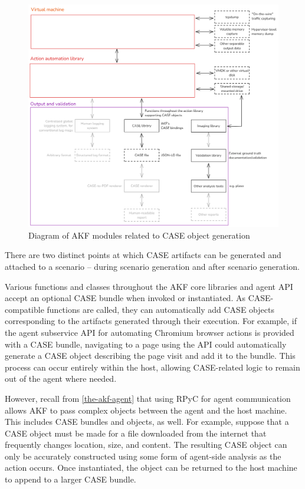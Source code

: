 \documentclass[letterpaper,12pt]{report}
\begin{document}
\begin{figure}[htbp]
\centering
\includegraphics[width=1\linewidth]{output-and-validation-b.png}
\caption{Diagram of AKF modules related to CASE object
generation}\label{fig:output-b}
\end{figure}

There are two distinct points at which CASE artifacts can be generated
and attached to a scenario -- during scenario generation and after
scenario generation.

Various functions and classes throughout the AKF core libraries and
agent API accept an optional CASE bundle when invoked or instantiated.
As CASE-compatible functions are called, they can automatically add CASE
objects corresponding to the artifacts generated through their
execution. For example, if the agent subservice API for automating
Chromium browser actions is provided with a CASE bundle, navigating to a
page using the API could automatically generate a CASE object describing
the page visit and add it to the bundle. This process can occur entirely
within the host, allowing CASE-related logic to remain out of the agent
where needed.

However, recall from \autoref{the-akf-agent} that using RPyC for agent communication allows AKF to pass
complex objects between the agent and the host machine. This includes
CASE bundles and objects, as well. For example, suppose that a CASE
object must be made for a file downloaded from the internet that
frequently changes location, size, and content. The resulting CASE
object can only be accurately constructed using some form of agent-side
analysis as the action occurs. Once instantiated, the object can be
returned to the host machine to append to a larger CASE bundle.
\end{document}
